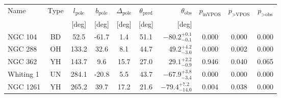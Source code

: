 \begingroup
\renewcommand{\arraystretch}{1.25}
\begin{tabular}{lcccccrccc}
	\toprule
	Name & Type & $l_\text{pole}$ & $b_\text{pole}$ & $\Delta_\text{pole}$ & $\theta_\text{pred}$ & $\theta_\text{obs}$ & $p_\text{inVPOS}$ & $p_\text{>VPOS}$ & $p_\text{>obs}$ \\
	 &  & [deg] & [deg] & [deg] & [deg] & [deg] &  &  &  \\
	\midrule
	NGC 104 & BD & 52.5 & -61.7 & 1.4 & 51.1 & $-80.2^{+0.1}_{-0.1}$ & 0.000 & 0.000 & 0.000 \\
	NGC 288 & OH & 133.2 & 32.6 & 8.1 & 44.7 & $49.2^{+4.2}_{-3.0}$ & 0.000 & 0.002 & 0.000 \\
	NGC 362 & YH & 143.7 & 9.6 & 15.7 & 27.0 & $29.1^{+2.2}_{-0.9}$ & 0.946 & 0.040 & 0.065 \\
	Whiting 1 & UN & 284.1 & -20.8 & 5.5 & 43.7 & $-67.9^{+3.8}_{-3.4}$ & 0.000 & 0.000 & 0.000 \\
	NGC 1261 & YH & 265.2 & 39.7 & 17.2 & 21.6 & $-79.4^{+7.2}_{-14.0}$ & 0.004 & 0.038 & 0.000 \\
	\bottomrule
\end{tabular}
\endgroup